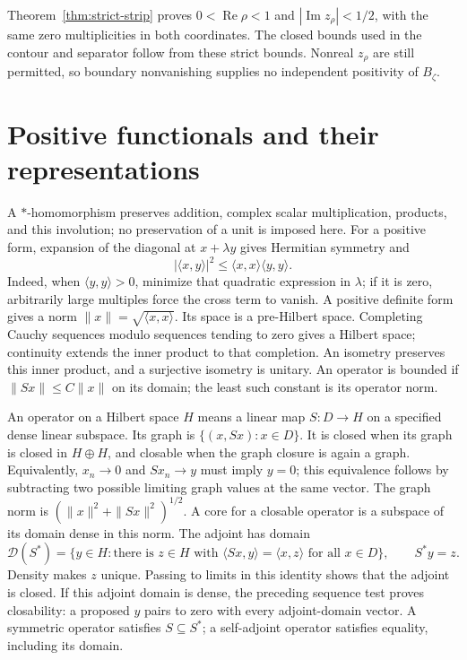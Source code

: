 \documentclass[11pt]{article}
\numberwithin{equation}{section}
\begin{document}
Theorem~\ref{thm:strict-strip} proves
$0<\operatorname{Re}\rho<1$ and $|\operatorname{Im}z_\rho|<1/2$,
with the same zero multiplicities in both coordinates.
The closed bounds used in the contour and separator follow from these
strict bounds.  Nonreal $z_\rho$ are still permitted, so boundary
nonvanishing supplies no independent positivity of $B_\zeta$.

\section{Positive functionals and their representations}

A $*$-homomorphism preserves addition, complex scalar multiplication,
products, and this involution; no preservation of a unit is imposed here.
For a positive form, expansion of the diagonal at $x+\lambda y$ gives
Hermitian symmetry and
\[
 |\langle x,y\rangle|^2\leq\langle x,x\rangle\langle y,y\rangle.
\]
Indeed, when $\langle y,y\rangle>0$, minimize that quadratic expression in
$\lambda$; if it is zero, arbitrarily large multiples force the cross term
to vanish.  A positive definite form gives a norm
$\|x\|=\sqrt{\langle x,x\rangle}$.  Its space is a pre-Hilbert space.
Completing Cauchy sequences modulo sequences tending to zero gives a
Hilbert space; continuity extends the inner product to that completion.
An isometry preserves this inner product, and a surjective isometry is
unitary.  An operator is bounded if $\|Sx\|\leq C\|x\|$ on its domain;
the least such constant is its operator norm.

An operator on a Hilbert space $H$ means a linear map $S:D\to H$ on a
specified dense linear subspace.  Its graph is $\{(x,Sx):x\in D\}$.
It is closed when its graph is closed in $H\oplus H$, and closable when
the graph closure is again a graph.  Equivalently, $x_n\to0$ and
$Sx_n\to y$ must imply $y=0$; this equivalence follows by subtracting two
possible limiting graph values at the same vector.
The graph norm is $(\|x\|^2+\|Sx\|^2)^{1/2}$.  A core for a closable
operator is a subspace of its domain dense in this norm.
The adjoint has domain
\[
 \mathcal D(S^*)=\{y\in H:\text{there is }z\in H\text{ with }
           \langle Sx,y\rangle=\langle x,z\rangle\text{ for all }x\in D\},
 \qquad S^*y=z.
\]
Density makes $z$ unique.  Passing to limits in this identity shows that
the adjoint is closed.  If this adjoint domain is dense, the preceding
sequence test proves closability: a proposed $y$ pairs to zero with every
adjoint-domain vector.  A symmetric operator satisfies $S\subseteq S^*$;
a self-adjoint operator satisfies equality, including its domain.
\end{document}
